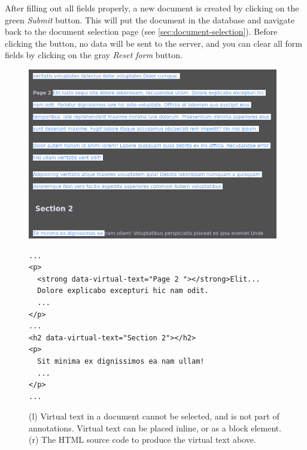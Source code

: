 After filling out all fields properly, a new document is created by clicking on the green \emph{Submit} button.
This will put the document in the database and navigate back to the document selection page (see \cref{sec:document-selection}).
Before clicking the button, no data will be sent to the server, and you can clear all form fields by clicking on the gray \emph{Reset form} button.


\begin{figure}[htb]
  \centering
  \begin{minipage}{6cm}
    \includegraphics[width=\textwidth]{../src/assets/annotator-documentation/virtual-text.png}
  \end{minipage}%
  \quad%
  \begin{minipage}{9cm}
    \begin{lstlisting}
...
<p>
  <strong data-virtual-text="Page 2 "></strong>Elit...
  Dolore explicabo excepturi hic nam odit.
  ...
</p>
...
<h2 data-virtual-text="Section 2"></h2>
<p>
  Sit minima ex dignissimos ea nam ullam!
  ...
</p>
...
    \end{lstlisting}
  \end{minipage}

  \caption{
    (l) Virtual text in a document cannot be selected, and is not part of annotations.
    Virtual text can be placed inline, or as a block element.
    (r) The HTML source code to produce the virtual text above.
  }
  \label{fig:virtual-text}
\end{figure}


